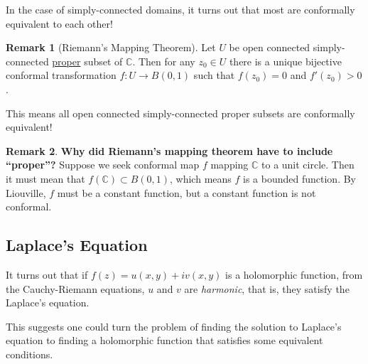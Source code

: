 \documentclass[a4paper, 12pt]{article}
\theoremstyle{definition}
\newtheorem{remark}{Remark}
\numberwithin{theorem}{section}
\numberwithin{definition}{section}
\numberwithin{exercise}{section}
\numberwithin{remark}{section}
\numberwithin{figure}{section}
\numberwithin{example}{section}
\newcommand{\C}{\mathbb{C}}
\begin{document}
In the case of simply-connected domains, it turns out that most are conformally equivalent to each other!
\begin{remark}[Riemann's Mapping Theorem]
    Let $U$ be open connected simply-connected \ul{proper} subset of $\C$.
    Then for any $z_0 \in U$ there is a unique bijective conformal transformation $f:U \rightarrow B\left( 0, 1 \right)$ such that $f(z_0) = 0$ and $f'(z_0) > 0$.

    This means all open connected simply-connected proper subsets are conformally equivalent!
\end{remark}
\begin{remark}
    \textbf{Why did Riemann's mapping theorem have to include ``proper''?}
    Suppose we seek conformal map $f$ mapping $\C$ to a unit circle.
    Then it must mean that $f(\C) \subset B\left( 0,1 \right)$,
    which means $f$ is a bounded function.
    By Liouville, $f$ must be a constant function, but a constant function is not conformal.
\end{remark}
\subsection{Laplace's Equation}
It turns out that if $f(z) = u(x,y) + i v(x,y)$ is a holomorphic function,
from the Cauchy-Riemann equations, $u$ and $v$ are \textit{harmonic},
that is, they satisfy the Laplace's equation.

This suggests one could turn the problem of finding the solution to Laplace's equation
to finding a holomorphic function that satisfies some equivalent conditions.
\end{document}
